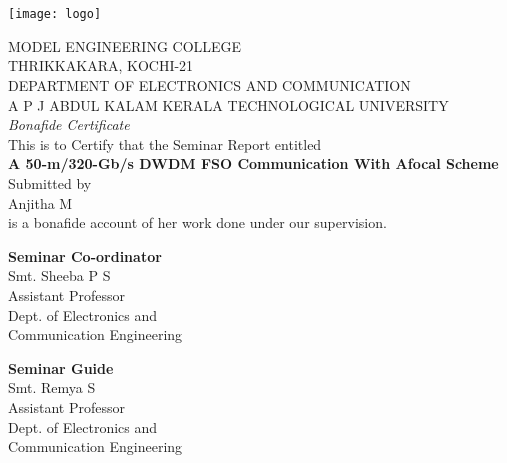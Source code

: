 \documentclass[hidelinks, 12pt]{report}
\begin{document}
\centering
\section*{}
\vspace{1cm}
\texttt{[image: logo]}

\begin{center}
MODEL ENGINEERING COLLEGE\\
\vspace{0.5cm}
THRIKKAKARA, KOCHI-21\\
\vspace{0.5cm}
DEPARTMENT OF ELECTRONICS AND COMMUNICATION \\
\vspace{0.5cm}
A P J ABDUL KALAM KERALA TECHNOLOGICAL UNIVERSITY \\
\vspace{1cm}
\textit{Bonafide Certificate}
\\This is to Certify that the Seminar Report entitled\\
\vspace{0.5cm}
\textbf{A 50-m/320-Gb/s DWDM FSO Communication With Afocal Scheme} 
\\
\vspace{0.5cm}
Submitted by\\
\vspace{0.2cm}
Anjitha M\\
\vspace{0.2cm}
is a bonafide account of her work done under our supervision. \\
\end{center}

\vspace{2cm}
\begin{minipage}[t]{10cm}
\flushleft \textbf{Seminar Co-ordinator}\\
Smt. Sheeba P S\\
Assistant Professor\\
Dept. of Electronics and\\
Communication Engineering
\end{minipage}
\vspace{2cm}
\begin{minipage}[t]{5cm}
\flushleft \textbf{Seminar Guide}\\
Smt. Remya S\\
Assistant Professor\\
Dept. of Electronics and\\
Communication Engineering
\end{minipage}
\end{document}
